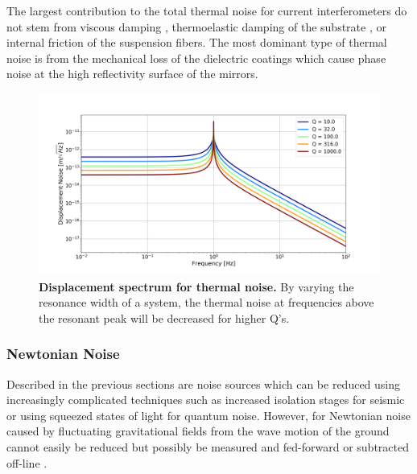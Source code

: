 		The largest contribution to the total thermal noise for current interferometers do not stem from viscous damping \cite{SaulsonThermalNoise}, thermoelastic damping of the substrate \cite{Saulson}, or internal friction of the suspension fibers.  The most dominant type of thermal noise is from the mechanical loss of the dielectric coatings \cite{HarryThermalCoat} \cite{EvansBallmerThermalOptic} which cause phase noise at the high reflectivity surface of the mirrors.
		
		\begin{figure}[ht]
			\centering
			\includegraphics[width=.8 \textwidth]{../Figures/ThermalNoise_ASD.png}
			\caption[Displacement spectrum for thermal noise.]  
			{\textbf{Displacement spectrum for thermal noise.} By varying the resonance width of a system, the thermal noise at frequencies above the resonant peak will be decreased for higher Q's.}
			\label{fig:ThermalNoise}
		\end{figure}
		
		\subsubsection{Newtonian Noise}
		Described in the previous sections are noise sources which can be reduced using increasingly complicated techniques such as increased isolation stages for seismic or using squeezed states of light for quantum noise.  However, for Newtonian noise caused by fluctuating gravitational fields from the wave motion of the ground cannot easily be reduced but possibly be measured and fed-forward or subtracted off-line \cite{DriggersNewtonian}\cite{SaulsonNewtonian}\cite{ThorneNewtonian}.

